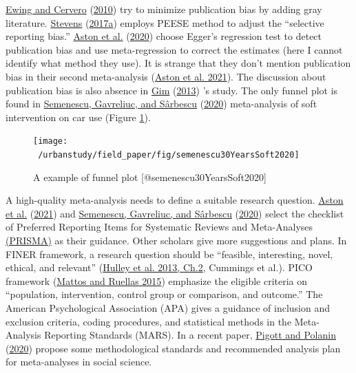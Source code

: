 \documentclass[
  11pt,
  openany]{memoir}
\begin{document}
\protect\hyperlink{ref-ewingTravelBuiltEnvironment2010}{Ewing and Cervero} (\protect\hyperlink{ref-ewingTravelBuiltEnvironment2010}{2010}) try to minimize publication bias by adding gray literature.
\protect\hyperlink{ref-stevensDoesCompactDevelopment2017}{Stevens} (\protect\hyperlink{ref-stevensDoesCompactDevelopment2017}{2017a}) employs PEESE method to adjust the ``selective reporting bias.''
\protect\hyperlink{ref-astonStudyDesignImpacts2020}{Aston et al.} (\protect\hyperlink{ref-astonStudyDesignImpacts2020}{2020}) choose Egger's regression test to detect publication bias and use meta-regression to correct the estimates (here I cannot identify what method they use). It is strange that they don't mention publication bias in their second meta-analysis (\protect\hyperlink{ref-astonExploringBuiltEnvironment2021}{Aston et al. 2021}).
The discussion about publication bias is also absence in \protect\hyperlink{ref-gimRelationshipsLandUse2013}{Gim} (\protect\hyperlink{ref-gimRelationshipsLandUse2013}{2013}) 's study.
The only funnel plot is found in \protect\hyperlink{ref-semenescu30YearsSoft2020}{Semenescu, Gavreliuc, and Sârbescu} (\protect\hyperlink{ref-semenescu30YearsSoft2020}{2020}) meta-analysis of soft intervention on car use (Figure \ref{fig:funnelplot2}).

\begin{figure}

{\centering \texttt{[image: ~/urbanstudy/field\_paper/fig/semenescu30YearsSoft2020]} 

}

\caption{A example of funnel plot [@semenescu30YearsSoft2020]}\label{fig:funnelplot2}
\end{figure}

A high-quality meta-analysis needs to define a suitable research question.
\protect\hyperlink{ref-astonExploringBuiltEnvironment2021}{Aston et al.} (\protect\hyperlink{ref-astonExploringBuiltEnvironment2021}{2021}) and \protect\hyperlink{ref-semenescu30YearsSoft2020}{Semenescu, Gavreliuc, and Sârbescu} (\protect\hyperlink{ref-semenescu30YearsSoft2020}{2020}) select the checklist of
Preferred Reporting Items for Systematic Reviews and Meta-Analyses \href{http://www.prisma-statement.org/}{(PRISMA)} as their guidance.
Other scholars give more suggestions and plans.
In FINER framework, a research question should be ``feasible, interesting, novel, ethical, and relevant'' (\protect\hyperlink{ref-hulleyDesigningClinicalResearch2013}{Hulley et al. 2013, Ch.2}, Cummings et al.).
PICO framework (\protect\hyperlink{ref-mattosSystematicReviewMetaanalysis2015}{Mattos and Ruellas 2015}) emphasize the eligible criteria on ``population, intervention, control group or comparison, and outcome.''
The American Psychological Association (APA) gives a guidance of inclusion and exclusion criteria, coding procedures, and statistical methods in the Meta-Analysis Reporting Standards (MARS).
In a recent paper, \protect\hyperlink{ref-pigottMethodologicalGuidancePaper2020}{Pigott and Polanin} (\protect\hyperlink{ref-pigottMethodologicalGuidancePaper2020}{2020}) propose some methodological standards and recommended analysis plan for meta-analyses in social science.
\end{document}
